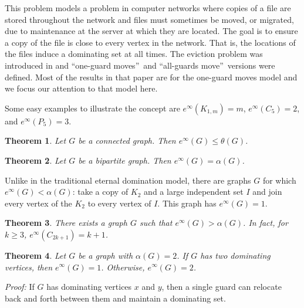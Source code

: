 \documentclass[12pt]{article}%
\newtheorem{theorem}{Theorem}[section]
\begin{document}
This problem models a problem in computer networks where copies of a file are
stored throughout the network and files must sometimes be moved, or migrated,
due to maintenance at the server at which they are located. The goal is to
ensure a copy of the file is close to every vertex in the network. That is,
the locations of the files induce a dominating set at all times. The eviction
problem was introduced in \cite{KLM} and \textquotedblleft one-guard
moves\textquotedblright\ and \textquotedblleft all-guards
move\textquotedblright\ versions were defined. Most of the results in that
paper are for the one-guard moves model and we focus our attention to that
model here.

Some easy examples to illustrate the concept are $e^{\infty}(K_{1, m})=m$,
$e^{\infty}(C_{5})=2$, and $e^{\infty}(P_{5})=3$.

\begin{theorem}
\emph{\cite{KLM}\hspace{0.1in}}Let $G$ be a connected graph. Then $e^{\infty
}(G)\leq\theta(G)$.
\end{theorem}

\begin{theorem}
\emph{\cite{KLM}\hspace{0.1in}}Let $G$ be a bipartite graph. Then $e^{\infty
}(G)=\alpha(G)$.
\end{theorem}

Unlike in the traditional eternal domination model, there are graphs $G$ for
which $e^{\infty}(G)<\alpha(G)$: take a copy of $K_{2}$ and a large
independent set $I$ and join every vertex of the $K_{2}$ to every vertex of
$I$. This graph has $e^{\infty}(G)=1$.

\begin{theorem}
\emph{\cite{KLM}\hspace{0.1in}}There exists a graph $G$ such that $e^{\infty
}(G)>\alpha(G)$. In fact, for $k \geq3$, $e^{\infty}(C_{2k+1}) = k+1$.
\end{theorem}

\begin{theorem}
\cite{KLM} Let $G$ be a graph with $\alpha(G) = 2$. If $G$ has two dominating
vertices, then $e^{\infty}(G) = 1$. Otherwise, $e^{\infty}(G) = 2$.
\label{ind-bound2}
\end{theorem}

\noindent\textit{Proof:} If $G$ has dominating vertices $x$ and $y$, then a
single guard can relocate back and forth between them and maintain a
dominating set.
\end{document}
